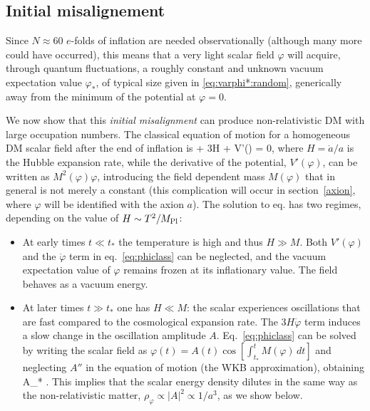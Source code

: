 \subsection{Initial misalignement}\label{sec:misalignement}
Since $N \approx 60$ $e$-folds of inflation are needed observationally (although many more could have occurred),
 this means that a very light scalar field $\varphi$ will 
acquire, through quantum fluctuations, a roughly constant and unknown vacuum expectation value $\varphi_*$, of typical size given in  \eqref{eq:varphi*:random}, generically away from the minimum of the potential at $\varphi=0$. 

We now show that
this {\em initial misalignment} can produce non-relativistic DM with large occupation numbers.
The classical equation of motion for a homogeneous DM scalar field  after the end of inflation is
\beq \label{eq:phiclass}
\ddot \varphi + 3H \dot \varphi + V'(\varphi)  = 0,
\eeq
where $H = \dot a/a$ is the Hubble expansion rate,
while the derivative of the potential, $V'(\varphi)$, can be written as $M^2(\varphi)\varphi$, introducing the field dependent mass  $M(\varphi)$ that in general is not
merely a constant (this complication will occur in section~\ref{axion}, where $\varphi$ will be identified with the axion $a$).
The solution to eq. has two regimes, depending on the value of $H\sim T^2/M_{\rm Pl}$:
\begin{itemize}
\item[$\lhd$] At early times $t\ll t_*$  the temperature is high and thus $H\gg M$. Both $V'(\varphi)$ and the $\ddot \varphi$ term in eq.~\eqref{eq:phiclass} can be neglected, and the vacuum expectation value of $\varphi$
remains frozen at its inflationary value. The field behaves as a vacuum energy.

\item[$\rhd$] At later times $t\gg t_*$ one has $H\ll M$: the scalar experiences oscillations that are fast compared to the cosmological expansion rate. The $3H\dot\varphi$ 
term induces a slow change in the oscillation amplitude $A$.
Eq.~\eqref{eq:phiclass} can be solved by writing the scalar field as
$\varphi (t)= A(t) \cos[ \int_{t_*}^t  M(\varphi) \,dt ]$
and neglecting $A''$ in the equation of motion (the WKB approximation), obtaining
\beq 
\label{eq:ddotphi} 
A\approx \varphi_* .
\eeq 
This implies that the scalar energy density dilutes in the same way as the non-relativistic matter, $\rho_\varphi\propto |A|^2\propto 1/a^3$, as we show below.
\end{itemize}
